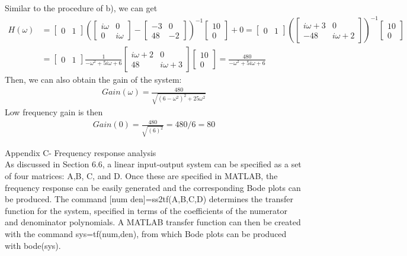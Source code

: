 \documentclass[paper=a4, fontsize=11pt]{scrartcl} %
\numberwithin{equation}{section} %
\numberwithin{figure}{section} %
\numberwithin{table}{section} %
\begin{document}
\begin{enumerate}[a)]
		Similar to the procedure of b), we can get
		\begin{align*}
			H(\omega)&= 
			\begin{bmatrix}
				0 & 1
			\end{bmatrix}
			(
			\begin{bmatrix}
				i\omega & 0\\
				0 & i\omega
			\end{bmatrix}
			-
			\begin{bmatrix}
				-3 & 0\\
				48 & -2
			\end{bmatrix})^{-1}
			\begin{bmatrix}
				10 \\0
			\end{bmatrix}
			+ 0
			=
			\begin{bmatrix}
				0 & 1
			\end{bmatrix}
			(
			\begin{bmatrix}
				i\omega+3 & 0\\
				-48 & i\omega+2
			\end{bmatrix}
			)^{-1}
			\begin{bmatrix}
				10 \\0
			\end{bmatrix}
			\\&=
			\begin{bmatrix}
				0 & 1
			\end{bmatrix}
			\frac{1}{-\omega^2+5i\omega+6}
			\begin{bmatrix}
				i\omega+2 & 0\\
				48 & i\omega+3
			\end{bmatrix}
			\begin{bmatrix}
				10 \\0
			\end{bmatrix}
			= \frac{480}{-\omega^2+5i\omega+6}
		\end{align*}
		Then, we can also obtain the gain of the system:
		\begin{align*}
			Gain(\omega)=\frac{480}{\sqrt{(6-\omega^2)^2+25\omega^2}}
		\end{align*}
		Low frequency gain is then
		\begin{align*}
			Gain(0)=\frac{480}{\sqrt{(6)^2}}=480/6=80
		\end{align*}
	\end{enumerate}
	Appendix C- Frequency response analysis \\
	As discussed in Section 6.6, a linear input-output system can be specified as a set of four matrices: A,B, C, and D. Once these are specified in MATLAB, the frequency response can be easily generated and the corresponding Bode plots can be produced. The command [num den]=ss2tf(A,B,C,D) determines the transfer function for the system, specified in terms of the coefficients of the numerator and denominator polynomials. A MATLAB transfer function can then be created with the command sys=tf(num,den), from which Bode plots can be produced with bode(sys).
\end{document}
